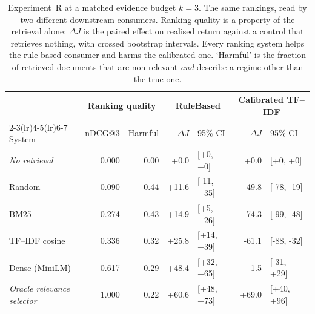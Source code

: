 \begin{table}[t]
\caption{Experiment~R at a matched evidence budget $k=3$. The same rankings,
read by two different downstream consumers. Ranking quality is a property of
the retrieval alone; $\Delta J$ is the paired effect on realised return against
a control that retrieves nothing, with crossed bootstrap intervals. Every
ranking system helps the rule-based consumer and harms the calibrated one.
`Harmful' is the fraction of retrieved documents that are non-relevant
\emph{and} describe a regime other than the true one.}
\label{tab:retrieval}
\centering\footnotesize\setlength{\tabcolsep}{2.5pt}
\begin{tabular}{@{}l rr rl rl@{}}
\toprule
 & \multicolumn{2}{c}{Ranking quality} & \multicolumn{2}{c}{RuleBased} & \multicolumn{2}{c}{Calibrated TF--IDF} \\
\cmidrule(lr){2-3}\cmidrule(lr){4-5}\cmidrule(lr){6-7}
System & nDCG@3 & Harmful & $\Delta J$ & 95\% CI & $\Delta J$ & 95\% CI \\
\midrule
\textit{No retrieval} & 0.000 & 0.00 & +0.0 & [+0, +0] & +0.0 & [+0, +0] \\
\midrule
Random & 0.090 & 0.44 & +11.6 & [-11, +35] & -49.8 & [-78, -19] \\
BM25 & 0.274 & 0.43 & +14.9 & [+5, +26] & -74.3 & [-99, -48] \\
TF--IDF cosine & 0.336 & 0.32 & +25.8 & [+14, +39] & -61.1 & [-88, -32] \\
Dense (MiniLM) & 0.617 & 0.29 & +48.4 & [+32, +65] & -1.5 & [-31, +29] \\
\midrule
\textit{Oracle relevance selector} & 1.000 & 0.22 & +60.6 & [+48, +73] & +69.0 & [+40, +96] \\
\bottomrule
\end{tabular}
\end{table}
